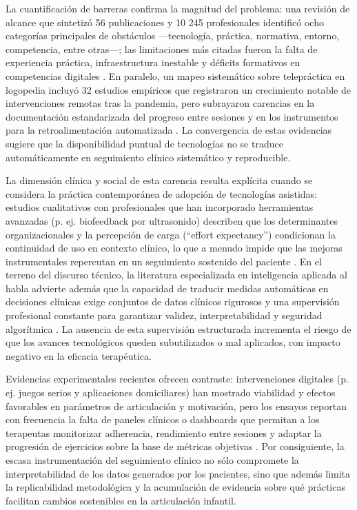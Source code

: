 \documentclass[12pt, oneside]{article}
\begin{document}
La cuantificación de barreras confirma la magnitud del problema: una revisión de alcance que sintetizó 56 publicaciones y 10 245 profesionales identificó ocho categorías principales de obstáculos —tecnología, práctica, normativa, entorno, competencia, entre otras—; las limitaciones más citadas fueron la falta de experiencia práctica, infraestructura inestable y déficits formativos en competencias digitales \parencite{Rettinger2023}. En paralelo, un mapeo sistemático sobre telepráctica en logopedia incluyó 32 estudios empíricos que registraron un crecimiento notable de intervenciones remotas tras la pandemia, pero subrayaron carencias en la documentación estandarizada del progreso entre sesiones y en los instrumentos para la retroalimentación automatizada \parencite{Guglani2023}. La convergencia de estas evidencias sugiere que la disponibilidad puntual de tecnologías no se traduce automáticamente en seguimiento clínico sistemático y reproducible.

La dimensión clínica y social de esta carencia resulta explícita cuando se considera la práctica contemporánea de adopción de tecnologías asistidas: estudios cualitativos con profesionales que han incorporado herramientas avanzadas (p. ej. biofeedback por ultrasonido) describen que los determinantes organizacionales y la percepción de carga (``effort expectancy'') condicionan la continuidad de uso en contexto clínico, lo que a menudo impide que las mejoras instrumentales repercutan en un seguimiento sostenido del paciente \parencite{Dugan2023}. En el terreno del discurso técnico, la literatura especializada en inteligencia aplicada al habla advierte además que la capacidad de traducir medidas automáticas en decisiones clínicas exige conjuntos de datos clínicos rigurosos y una supervisión profesional constante para garantizar validez, interpretabilidad y seguridad algorítmica \parencite{Berisha2024}. La ausencia de esta supervisión estructurada incrementa el riesgo de que los avances tecnológicos queden subutilizados o mal aplicados, con impacto negativo en la eficacia terapéutica.

Evidencias experimentales recientes ofrecen contraste: intervenciones digitales (p. ej. juegos serios y aplicaciones domiciliares) han mostrado viabilidad y efectos favorables en parámetros de articulación y motivación, pero los ensayos reportan con frecuencia la falta de paneles clínicos o dashboards que permitan a los terapeutas monitorizar adherencia, rendimiento entre sesiones y adaptar la progresión de ejercicios sobre la base de métricas objetivas \parencite{Kim2023,Gijbels2024}. Por consiguiente, la escasa instrumentación del seguimiento clínico no sólo compromete la interpretabilidad de los datos generados por los pacientes, sino que además limita la replicabilidad metodológica y la acumulación de evidencia sobre qué prácticas facilitan cambios sostenibles en la articulación infantil.
\end{document}
